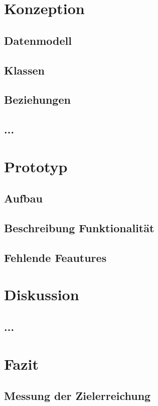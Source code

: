 \documentclass[12pt, titlepage]{article}
\begin{document}
\newpage
\section{Konzeption}
\subsection{Datenmodell}
\subsection{Klassen}
\subsection{Beziehungen}
\subsection{...}

\newpage
\section{Prototyp}
\subsection{Aufbau}
\subsection{Beschreibung Funktionalität}
\subsection{Fehlende Feautures}

\newpage
\section{Diskussion}
\subsection{...}

\newpage
\section{Fazit}
\subsection{Messung der Zielerreichung}

\newpage
\end{document}
